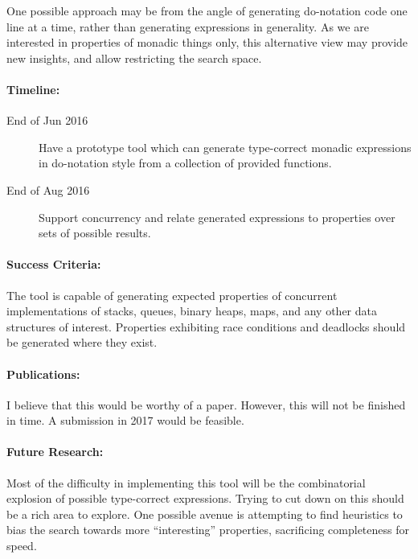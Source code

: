 One possible approach may be from the angle of generating do-notation
code one line at a time, rather than generating expressions in
generality. As we are interested in properties of monadic things only,
this alternative view may provide new insights, and allow restricting
the search space.

\paragraph{Timeline:}

\begin{description}
\item[End of Jun 2016] Have a prototype tool which can generate
  type-correct monadic expressions in do-notation style from a
  collection of provided functions.

\item[End of Aug 2016] Support concurrency and relate generated
  expressions to properties over sets of possible results.
\end{description}

\paragraph{Success Criteria:}

The tool is capable of generating expected properties of concurrent
implementations of stacks, queues, binary heaps, maps, and any other
data structures of interest. Properties exhibiting race conditions and
deadlocks should be generated where they exist.

\paragraph{Publications:}

I believe that this would be worthy of a paper. However, this will not
be finished in time. A submission in 2017 would be feasible.

\paragraph{Future Research:}

Most of the difficulty in implementing this tool will be the
combinatorial explosion of possible type-correct expressions. Trying
to cut down on this should be a rich area to explore. One possible
avenue is attempting to find heuristics to bias the search towards
more ``interesting'' properties, sacrificing completeness for speed.
